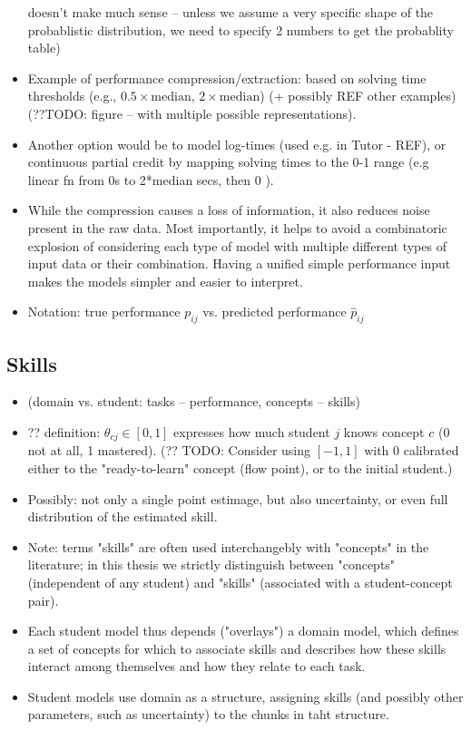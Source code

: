\begin{itemize}
  doesn't make much sense -- unless we assume a very specific shape of the
  probablistic distribution, we need to specify 2 numbers to get the probablity
  table)
\item Example of performance compression/extraction:
  based on solving time thresholds
  (e.g., $0.5 \times \text{median}$, $2 \times \text{median}$)
  (+ possibly REF other examples)
  (??TODO: figure -- with multiple possible representations).
\item Another option would be to model log-times (used e.g. in Tutor - REF),
  or continuous partial credit by mapping solving times to the 0-1 range
  (e.g linear fn from 0s to 2*median secs, then 0 \cite{alg.mastery}).
\item While the compression causes a loss of information,
  it also reduces noise present in the raw data.
  Most importantly, it helps to avoid a combinatoric explosion of
  considering each type of model with multiple different types of input data or
  their combination.
  Having a unified simple performance input makes the models simpler and
  easier to interpret.
\item Notation: true performance $p_{ij}$ vs. predicted performance $\hat{p}_{ij}$
\end{itemize}


\subsection{Skills}

\begin{itemize}
\item (domain vs. student: tasks -- performance, concepts -- skills)
\item ?? definition:
  $\theta_{cj} \in [0, 1]$ expresses how much student $j$ knows concept $c$
  (0 not at all, 1 mastered).
  (?? TODO: Consider using $[-1, 1]$ with 0 calibrated either to the "ready-to-learn"
  concept (flow point), or to the initial student.)
\item Possibly: not only a single point estimage, but also uncertainty,
  or even full distribution of the estimated skill.
\item Note: terms "skills" are often used interchangebly with "concepts" in
  the literature; in this thesis we strictly distinguish between "concepts"
  (independent of any student) and "skills" (associated with a student-concept
  pair).
\item Each student model thus depends ("overlays") a domain model, which
  defines a set of concepts for which to associate skills
  and describes how these skills interact among themselves and how they
  relate to each task.
\item Student models use domain as a structure,
  assigning skills (and possibly other parameters, such as uncertainty)
  to the chunks in taht structure.
\end{itemize}


